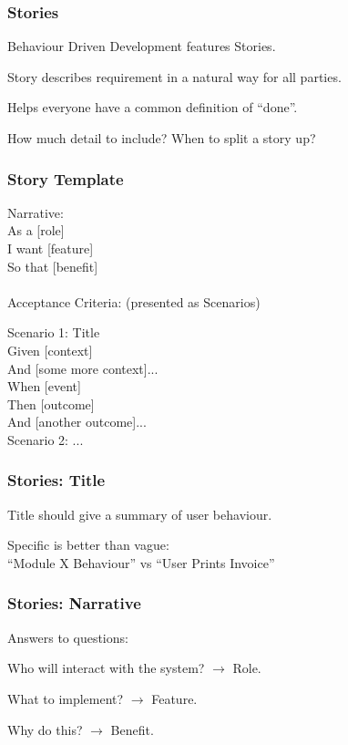 \begin{frame}
	\frametitle{Stories}
	\begin{changemargin}{1cm}
		Behaviour Driven Development features \alert{Stories}.
		
		Story describes requirement in a natural way for all parties.
		
		Helps everyone have a common definition of ``done''.
		
		How much detail to include? When to split a story up?
		
	\end{changemargin}
\end{frame}

\begin{frame}
	\frametitle{Story Template}
	\begin{changemargin}{1cm}
	
	Narrative:\\
	As a [role]\\
	I want [feature]\\
	So that [benefit]\\~\\

	Acceptance Criteria: (presented as Scenarios)

	Scenario 1: Title\\
	Given [context]\\
	  And [some more context]...\\
	When  [event]\\
	Then  [outcome]\\
	  And [another outcome]...\\

	Scenario 2: ...
	
	\end{changemargin}
\end{frame}

\begin{frame}
	\frametitle{Stories: Title}
	\begin{changemargin}{1cm}
		Title should give a summary of user behaviour.
		
		Specific is better than vague:\\
		``Module X Behaviour'' vs ``User Prints Invoice''
		
		
	\end{changemargin}
\end{frame}

\begin{frame}
	\frametitle{Stories: Narrative}
	\begin{changemargin}{1cm}
		Answers to questions:
		
		Who will interact with the system? $\rightarrow$ Role.
		
		What to implement? $\rightarrow$ Feature.
		
		Why do this? $\rightarrow$ Benefit. 
		
		
	\end{changemargin}
\end{frame}

